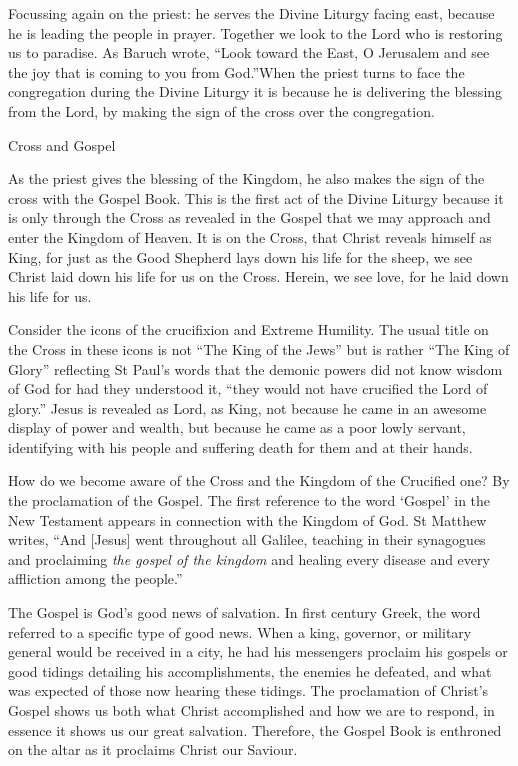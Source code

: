 \documentclass[
]{article}
\begin{document}
Focussing again on the priest: he serves the Divine Liturgy facing east,
because he is leading the people in prayer. Together we look to the Lord
who is restoring us to paradise. As Baruch wrote, ``Look toward the
East, O Jerusalem and see the joy that is coming to you from God.''When
the priest turns to face the congregation during the Divine Liturgy it
is because he is delivering the blessing from the Lord, by making the
sign of the cross over the congregation.

Cross and Gospel

As the priest gives the blessing of the Kingdom, he also makes the sign
of the cross with the Gospel Book. This is the first act of the Divine
Liturgy because it is only through the Cross as revealed in the Gospel
that we may approach and enter the Kingdom of Heaven. It is on the
Cross, that Christ reveals himself as King, for just as the Good
Shepherd lays down his life for the sheep, we see Christ laid down his
life for us on the Cross. Herein, we see love, for he laid down his life
for us.

Consider the icons of the crucifixion and Extreme Humility. The usual
title on the Cross in these icons is not ``The King of the Jews'' but is
rather ``The King of Glory'' reflecting St Paul's words that the demonic
powers did not know wisdom of God for had they understood it, ``they
would not have crucified the Lord of glory.'' Jesus is revealed as Lord,
as King, not because he came in an awesome display of power and wealth,
but because he came as a poor lowly servant, identifying with his people
and suffering death for them and at their hands.

How do we become aware of the Cross and the Kingdom of the Crucified
one? By the proclamation of the Gospel. The first reference to the word
`Gospel' in the New Testament appears in connection with the Kingdom of
God. St Matthew writes, ``And {[}Jesus{]} went throughout all Galilee,
teaching in their synagogues and proclaiming \emph{the gospel of the
kingdom} and healing every disease and every affliction among the
people.''

The Gospel is God's good news of salvation. In first century Greek, the
word referred to a specific type of good news. When a king, governor, or
military general would be received in a city, he had his messengers
proclaim his gospels or good tidings detailing his accomplishments, the
enemies he defeated, and what was expected of those now hearing these
tidings. The proclamation of Christ's Gospel shows us both what Christ
accomplished and how we are to respond, in essence it shows us our great
salvation. Therefore, the Gospel Book is enthroned on the altar as it
proclaims Christ our Saviour.
\end{document}
